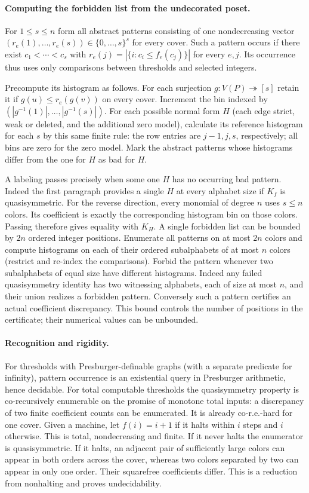 \documentclass[11pt]{article}
\begin{document}
\paragraph{Computing the forbidden list from the undecorated poset.}
For $1\le s\le n$ form all abstract patterns consisting of one nondecreasing vector $(r_e(1),\ldots,r_e(s))\in\{0,\ldots,s\}^s$ for every cover. Such a pattern occurs if there exist $c_1<\cdots<c_s$ with $r_e(j)=|\{i:c_i\le f_e(c_j)\}|$ for every $e,j$. Its occurrence thus uses only comparisons between thresholds and selected integers.

Precompute its histogram as follows. For each surjection $g:V(P)\twoheadrightarrow[s]$ retain it if $g(u)\le r_e(g(v))$ on every cover. Increment the bin indexed by $(|g^{-1}(1)|,\ldots,|g^{-1}(s)|)$. For each possible normal form $H$ (each edge strict, weak or deleted, and the additional zero model), calculate its reference histogram for each $s$ by this same finite rule: the row entries are $j-1,j,s$, respectively; all bins are zero for the zero model. Mark the abstract patterns whose histograms differ from the one for $H$ as bad for $H$.

A labeling passes precisely when some one $H$ has no occurring bad pattern. Indeed the first paragraph provides a single $H$ at every alphabet size if $K_f$ is quasisymmetric. For the reverse direction, every monomial of degree $n$ uses $s\le n$ colors. Its coefficient is exactly the corresponding histogram bin on those colors. Passing therefore gives equality with $K_H$. A single forbidden list can be bounded by $2n$ ordered integer positions. Enumerate all patterns on at most $2n$ colors and compute histograms on each of their ordered subalphabets of at most $n$ colors (restrict and re-index the comparisons). Forbid the pattern whenever two subalphabets of equal size have different histograms. Indeed any failed quasisymmetry identity has two witnessing alphabets, each of size at most $n$, and their union realizes a forbidden pattern. Conversely such a pattern certifies an actual coefficient discrepancy. This bound controls the number of positions in the certificate; their numerical values can be unbounded.

\paragraph{Recognition and rigidity.}
For thresholds with Presburger-definable graphs (with a separate predicate for infinity), pattern occurrence is an existential query in Presburger arithmetic, hence decidable. For total computable thresholds the quasisymmetry property is co-recursively enumerable on the promise of monotone total inputs: a discrepancy of two finite coefficient counts can be enumerated. It is already co-r.e.-hard for one cover. Given a machine, let $f(i)=i+1$ if it halts within $i$ steps and $i$ otherwise. This is total, nondecreasing and finite. If it never halts the enumerator is quasisymmetric. If it halts, an adjacent pair of sufficiently large colors can appear in both orders across the cover, whereas two colors separated by two can appear in only one order. Their squarefree coefficients differ. This is a reduction from nonhalting and proves undecidability.
\end{document}
